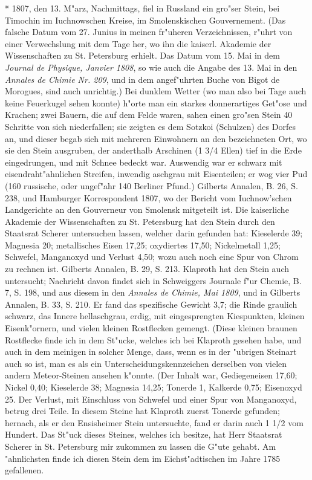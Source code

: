 \documentclass[a4paper, 11pt, oneside, polutonikogreek, german]{article}
\begin{document}
* 1807, den 13. M"arz, Nachmittags, fiel in Russland ein gro"ser Stein, bei Timochin im Iuchnowschen Kreise, im Smolenskischen Gouvernement. (Das falsche Datum vom 27. Junius in meinen fr"uheren Verzeichnissen, r"uhrt von einer Verwechslung mit dem Tage her, wo ihn die kaiserl. Akademie der Wissenschaften zu St. Petersburg erhielt. Das Datum vom 15. Mai in dem \emph{Journal de Physique, Janvier 1808}, so wie auch die Angabe des 13. Mai in den \emph{Annales de Chimie Nr. 209}, und in dem angef"uhrten Buche von Bigot de Morogues, sind auch unrichtig.) Bei dunklem Wetter (wo man also bei Tage auch keine Feuerkugel sehen konnte) h"orte man ein starkes donnerartiges Get"ose und Krachen; zwei Bauern, die auf dem Felde waren, sahen einen gro"sen Stein 40 Schritte von sich niederfallen; sie zeigten es dem Sotzkoi (Schulzen) des Dorfes an, und dieser begab sich mit mehreren Einwohnern an den bezeichneten Ort, wo sie den Stein ausgruben, der anderthalb Arschinen (1 3/4 Ellen) tief in die Erde eingedrungen, und mit Schnee bedeckt war. Auswendig war er schwarz mit eisendraht"ahnlichen Streifen, inwendig aschgrau mit Eisenteilen; er wog vier Pud (160 russische, oder ungef"ahr 140 Berliner Pfund.) Gilberts Annalen, B. 26, S. 238, und Hamburger Korrespondent 1807, wo der Bericht vom Iuchnow'schen Landgerichte an den Gouverneur von Smolensk mitgeteilt ist. Die kaiserliche Akademie der Wissenschaften zu St. Petersburg hat den Stein durch den Staatsrat Scherer untersuchen lassen, welcher darin gefunden hat: Kieselerde 39; Magnesia 20; metallisches Eisen 17,25; oxydiertes 17,50; Nickelmetall 1,25; Schwefel, Manganoxyd und Verlust 4,50; wozu auch noch eine Spur von Chrom zu rechnen ist. Gilberts Annalen, B. 29, S. 213. Klaproth hat den Stein auch untersucht; Nachricht davon findet sich in Schweiggers Journale f"ur Chemie, B. 7, S. 198, und aus diesem in den \emph{Annales de Chimie, Mai 1809}, und in Gilberts Annalen, B. 33, S. 210. Er fand das spezifische Gewicht 3,7; die Rinde graulich schwarz, das Innere hellaschgrau, erdig, mit eingesprengten Kiespunkten, kleinen Eisenk"ornern, und vielen kleinen Rostflecken gemengt. (Diese kleinen braunen Rostflecke finde ich in dem St"ucke, welches ich bei Klaproth gesehen habe, und auch in dem meinigen in solcher Menge, dass, wenn es in der "ubrigen Steinart auch so ist, man es als ein Unterscheidungskennzeichen derselben von vielen andern Meteor-Steinen ansehen k"onnte. (Der Inhalt war, Gediegeneisen 17,60; Nickel 0,40; Kieselerde 38; Magnesia 14,25; Tonerde 1, Kalkerde 0,75; Eisenoxyd 25. Der Verlust, mit Einschluss von Schwefel und einer Spur von Manganoxyd, betrug drei Teile. In diesem Steine hat Klaproth zuerst Tonerde gefunden; hernach, als er den Ensisheimer Stein untersuchte, fand er darin auch 1 1/2 vom Hundert. Das St"uck dieses Steines, welches ich besitze, hat Herr Staatsrat Scherer in St. Petersburg mir zukommen zu lassen die G"ute gehabt. Am "ahnlichsten finde ich diesen Stein dem im Eichst"adtischen im Jahre 1785 gefallenen.
\end{document}
